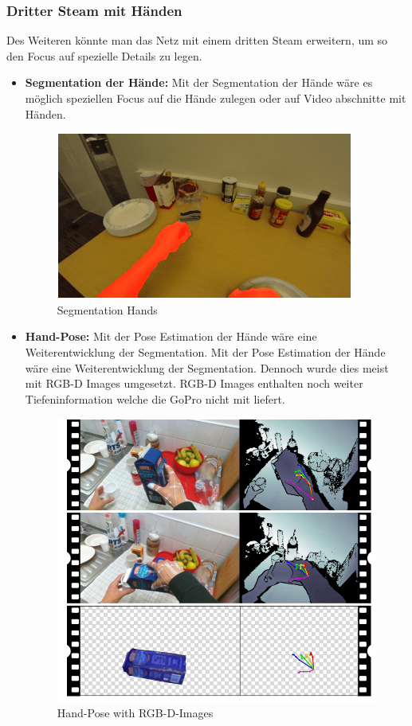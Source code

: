 \subsubsection{Dritter Steam mit Händen}
Des Weiteren könnte man das Netz mit einem dritten Steam erweitern, um so den Focus auf spezielle Details zu legen.

\begin{itemize}

\item \textbf{Segmentation der Hände:}
Mit der Segmentation der Hände wäre es möglich speziellen Focus auf die Hände zulegen oder auf Video abschnitte mit Händen.

\begin{figure}[!htb]
  \centering
  \includegraphics[scale=0.5]{img/hands.png}
  \caption{Segmentation Hands  \cite{Bambach_2015_ICCV}}
  \label{fig:Optical FLow}
\end{figure}

\item \textbf{Hand-Pose:}
Mit der Pose Estimation der Hände wäre eine Weiterentwicklung der Segmentation. Mit der Pose Estimation der Hände wäre eine Weiterentwicklung der Segmentation. Dennoch wurde dies meist mit RGB-D Images umgesetzt. RGB-D Images enthalten noch weiter Tiefeninformation welche die GoPro nicht mit liefert.

\begin{figure}[!htb]
  \centering
  \includegraphics[scale=0.25]{img/Hand-Pose.png}
  \caption{Hand-Pose with RGB-D-Images   \cite{Hand-Pose-paper}}
  \label{fig:Optical Flow}
\end{figure}

\end{itemize}
